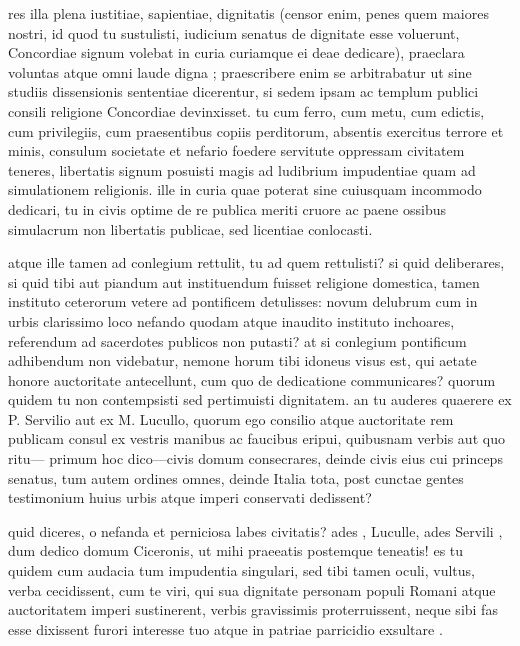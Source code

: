  res illa plena iustitiae, sapientiae, dignitatis (censor enim, penes quem maiores nostri, id quod tu sustulisti, iudicium senatus de dignitate esse voluerunt, Concordiae signum volebat in curia curiamque ei deae dedicare), praeclara voluntas atque omni laude digna ; praescribere enim se arbitrabatur ut sine studiis dissensionis sententiae dicerentur, si sedem ipsam ac templum publici consili religione Concordiae devinxisset. tu cum ferro, cum metu, cum edictis, cum privilegiis, cum praesentibus copiis perditorum, absentis exercitus terrore et minis, consulum societate et nefario foedere servitute oppressam civitatem teneres, libertatis signum posuisti magis ad ludibrium impudentiae quam ad simulationem religionis. ille in curia quae poterat sine cuiusquam incommodo dedicari, tu in civis optime de re publica meriti cruore ac paene ossibus simulacrum non libertatis publicae, sed licentiae conlocasti.

 atque ille tamen ad conlegium rettulit, tu ad quem rettulisti? si quid deliberares, si quid tibi aut piandum aut instituendum fuisset religione domestica, tamen instituto ceterorum vetere ad pontificem detulisses: novum delubrum cum in urbis clarissimo loco nefando quodam atque inaudito instituto inchoares, referendum ad sacerdotes publicos non putasti? at si conlegium pontificum adhibendum non videbatur, nemone horum tibi idoneus visus est, qui aetate honore auctoritate antecellunt, cum quo de dedicatione communicares? quorum quidem tu non contempsisti sed pertimuisti dignitatem. an tu auderes quaerere ex P. Servilio aut ex M. Lucullo, quorum ego consilio atque auctoritate rem publicam consul ex vestris manibus ac faucibus eripui, quibusnam verbis aut quo ritu— primum hoc dico—civis domum consecrares, deinde civis eius cui princeps senatus, tum autem ordines omnes, deinde Italia tota, post cunctae gentes testimonium huius urbis atque imperi conservati dedissent?

 quid diceres, o nefanda et perniciosa labes civitatis? ades , Luculle, ades Servili , dum dedico domum Ciceronis, ut mihi praeeatis postemque teneatis! es tu quidem cum audacia tum impudentia singulari, sed tibi tamen oculi, vultus, verba cecidissent, cum te viri, qui sua dignitate personam populi Romani atque auctoritatem imperi sustinerent, verbis gravissimis proterruissent, neque sibi fas esse dixissent furori interesse tuo atque in patriae parricidio exsultare .

